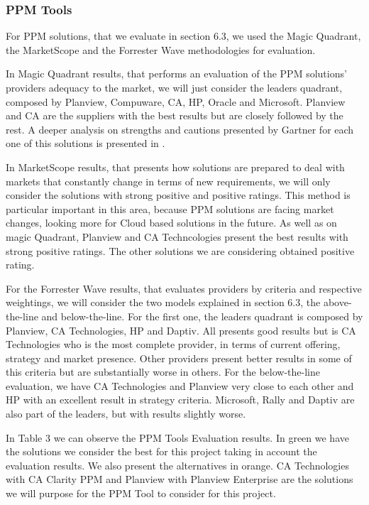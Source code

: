 \subsubsection{PPM Tools}

For PPM solutions, that we evaluate in section 6.3, we used the Magic Quadrant, the MarketScope and the Forrester Wave methodologies for evaluation.\par
In Magic Quadrant results, that performs an evaluation of the PPM solutions' providers adequacy to the market, we will just consider the leaders quadrant, composed by Planview, Compuware, CA, HP, Oracle and Microsoft. Planview and CA are the suppliers with the best results but are closely followed by the rest. A deeper analysis on strengths and cautions presented by Gartner for each one of this solutions is presented in \cite{magicQuadrantPPM}.\par
In MarketScope results, that presents how solutions are prepared to deal with markets that constantly change in terms of new requirements, we will only consider the solutions with strong positive and positive ratings. This method is particular important in this area, because PPM solutions are facing market changes, looking more for Cloud based solutions in the future. As well as on magic Quadrant, Planview and CA Techncologies present the best results with strong positive ratings. The other solutions we are considering obtained positive rating.\par
For the Forrester Wave results, that evaluates providers by criteria and respective weightings, we will consider the two models explained in section 6.3, the above-the-line and below-the-line. For the first one, the leaders quadrant is composed by Planview, CA Technologies, HP and Daptiv. All presents good results but is CA Technologies who is the most complete provider, in terms of current offering, strategy and market presence. Other providers present better results in some of this criteria but are substantially worse in others. For the below-the-line evaluation, we have CA Technologies and Planview very close to each other and HP with an excellent result in strategy criteria. Microsoft, Rally and Daptiv are also part of the leaders, but with results slightly worse.\par
In Table 3 we can observe the PPM Tools Evaluation results. In green we have the solutions we consider the best for this project taking in account the evaluation results. We also present the alternatives in orange. CA Technologies with CA Clarity PPM and Planview with Planview Enterprise are the solutions we will purpose for the PPM Tool to consider for this project.


